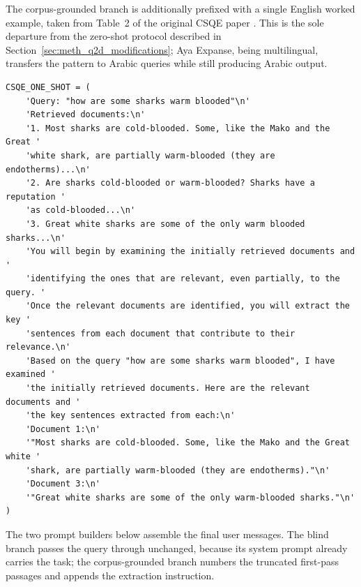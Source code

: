 The corpus-grounded branch is additionally prefixed with a single English worked
example, taken from Table~2 of the original CSQE paper \cite{lei_2024_csqe}. This
is the sole departure from the zero-shot protocol described in
Section~\ref{sec:meth_q2d_modifications}; Aya Expanse, being multilingual,
transfers the pattern to Arabic queries while still producing Arabic output.

\begin{codeblock}
\begin{lstlisting}[caption={The one-shot demonstration prepended to the corpus-grounded prompt.},label={lst:oneshot}]
CSQE_ONE_SHOT = (
    'Query: "how are some sharks warm blooded"\n'
    'Retrieved documents:\n'
    '1. Most sharks are cold-blooded. Some, like the Mako and the Great '
    'white shark, are partially warm-blooded (they are endotherms)...\n'
    '2. Are sharks cold-blooded or warm-blooded? Sharks have a reputation '
    'as cold-blooded...\n'
    '3. Great white sharks are some of the only warm blooded sharks...\n'
    'You will begin by examining the initially retrieved documents and '
    'identifying the ones that are relevant, even partially, to the query. '
    'Once the relevant documents are identified, you will extract the key '
    'sentences from each document that contribute to their relevance.\n'
    'Based on the query "how are some sharks warm blooded", I have examined '
    'the initially retrieved documents. Here are the relevant documents and '
    'the key sentences extracted from each:\n'
    'Document 1:\n'
    '"Most sharks are cold-blooded. Some, like the Mako and the Great white '
    'shark, are partially warm-blooded (they are endotherms)."\n'
    'Document 3:\n'
    '"Great white sharks are some of the only warm-blooded sharks."\n'
)
\end{lstlisting}
\end{codeblock}

The two prompt builders below assemble the final user messages. The blind branch
passes the query through unchanged, because its system prompt already carries the
task; the corpus-grounded branch numbers the truncated first-pass passages and
appends the extraction instruction.

